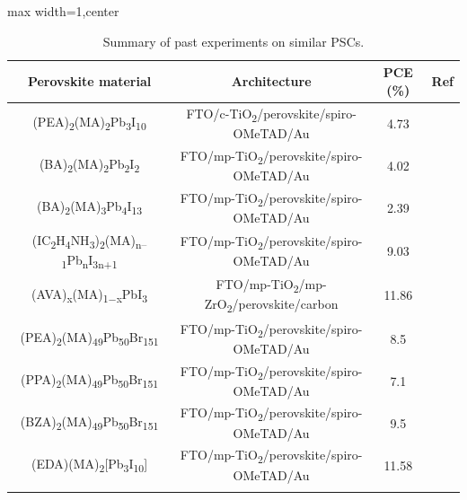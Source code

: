 \begin{table}[htb]
\caption{Summary of past experiments on similar PSCs.}
\begin{adjustbox}{max width=1\textwidth,center}
\begin{tabular}{c c c c}
\hline
    \textbf{Perovskite material} & \textbf{Architecture} & \textbf{PCE (\%)} & \textbf{Ref}\\ \hline
    (PEA)\textsubscript{2}(MA)\textsubscript{2}Pb\textsubscript{3}I\textsubscript{10}           & FTO/c-TiO\textsubscript{2}/perovskite/spiro-OMeTAD/Au  & 4.73  & {\cite{smith_layered_2014}} \\ \hline
    (BA)\textsubscript{2}(MA)\textsubscript{2}Pb\textsubscript{2}I\textsubscript{2}            & FTO/mp-TiO\textsubscript{2}/perovskite/spiro-OMeTAD/Au & 4.02  & {\cite{cao_2d_2015}} \\ \hline
    (BA)\textsubscript{2}(MA)\textsubscript{3}Pb\textsubscript{4}I\textsubscript{13}            & FTO/mp-TiO\textsubscript{2}/perovskite/spiro-OMeTAD/Au & 2.39  & {\cite{cao_2d_2015}} \\ \hline
    (IC\textsubscript{2}H\textsubscript{4}NH\textsubscript{3})\textsubscript{2}(MA)\textsubscript{n–1}Pb\textsubscript{n}I\textsubscript{3n+1}  & FTO/mp-TiO\textsubscript{2}/perovskite/spiro-OMeTAD/Au & 9.03  & {\cite{koh_nanostructuring_2016}}\\ \hline
    (AVA)\textsubscript{x}(MA)\textsubscript{1−x}PbI\textsubscript{3}           & FTO/mp-TiO\textsubscript{2}/mp-ZrO\textsubscript{2}/perovskite/carbon  & 11.86 & {\cite{saparov_organicinorganic_2016}}\\ \hline
    (PEA)\textsubscript{2}(MA)\textsubscript{49}Pb\textsubscript{50}Br\textsubscript{151}       & FTO/mp-TiO\textsubscript{2}/perovskite/spiro-OMeTAD/Au & 8.5   & {\cite{cohen_high_2017-1}} \\ \hline
    (PPA)\textsubscript{2}(MA)\textsubscript{49}Pb\textsubscript{50}Br\textsubscript{151}       & FTO/mp-TiO\textsubscript{2}/perovskite/spiro-OMeTAD/Au & 7.1   & {\cite{cohen_high_2017}} \\ \hline
    (BZA)\textsubscript{2}(MA)\textsubscript{49}Pb\textsubscript{50}Br\textsubscript{151}       & FTO/mp-TiO\textsubscript{2}/perovskite/spiro-OMeTAD/Au & 9.5   & {\cite{cohen_high_2017} \\ \hline
    (EDA)(MA)\textsubscript{2}{[Pb\textsubscript{3}I\textsubscript{10}]}      & FTO/mp-TiO\textsubscript{2}/perovskite/spiro-OMeTAD/Au & 11.58 & {\cite{jiang_new_2016} \\ \hline
}}
\end{tabular}
\end{adjustbox}
\end{table}
